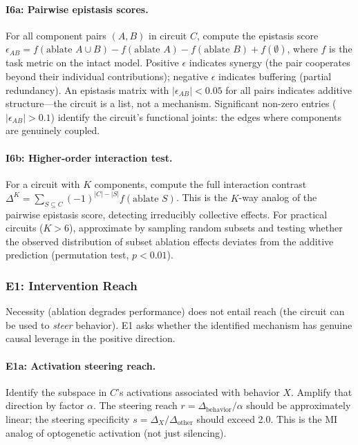 \documentclass{article}
\begin{document}
\paragraph{I6a: Pairwise epistasis scores.} For all component pairs $(A, B)$ in circuit $C$, compute the epistasis score $\epsilon_{AB} = f(\text{ablate } A \cup B) - f(\text{ablate } A) - f(\text{ablate } B) + f(\emptyset)$, where $f$ is the task metric on the intact model. Positive $\epsilon$ indicates synergy (the pair cooperates beyond their individual contributions); negative $\epsilon$ indicates buffering (partial redundancy). An epistasis matrix with $|\epsilon_{AB}| < 0.05$ for all pairs indicates additive structure---the circuit is a list, not a mechanism. Significant non-zero entries ($|\epsilon_{AB}| > 0.1$) identify the circuit's functional joints: the edges where components are genuinely coupled.

\paragraph{I6b: Higher-order interaction test.} For a circuit with $K$ components, compute the full interaction contrast $\Delta^K = \sum_{S \subseteq C} (-1)^{|C|-|S|} f(\text{ablate } S)$. This is the $K$-way analog of the pairwise epistasis score, detecting irreducibly collective effects. For practical circuits ($K > 6$), approximate by sampling random subsets and testing whether the observed distribution of subset ablation effects deviates from the additive prediction (permutation test, $p < 0.01$).

\subsubsection{E1: Intervention Reach}

Necessity (ablation degrades performance) does not entail reach (the circuit can be used to \emph{steer} behavior). E1 asks whether the identified mechanism has genuine causal leverage in the positive direction.

\paragraph{E1a: Activation steering reach.} Identify the subspace in $C$'s activations associated with behavior $X$. Amplify that direction by factor $\alpha$. The steering reach $r = \Delta_{\text{behavior}} / \alpha$ should be approximately linear; the steering specificity $s = \Delta_X / \Delta_{\text{other}}$ should exceed 2.0. This is the MI analog of optogenetic activation (not just silencing).
\end{document}
